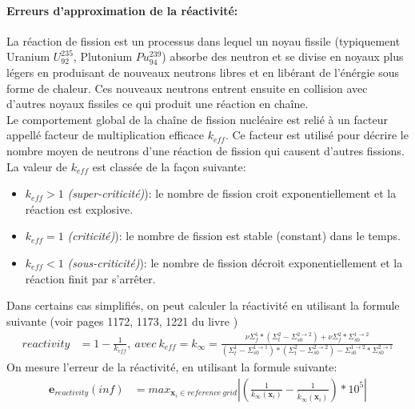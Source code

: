 \paragraph{Erreurs d'approximation de la réactivité:\\}
\hspace{0.5cm} La réaction de fission est un processus dans lequel un noyau fissile (typiquement Uranium $U_{92}^{235}$, Plutonium $Pu_{94}^239$) absorbe
des neutron et se divise en noyaux plus légers en produisant de nouveaux neutrons libres et en libérant de l'énérgie sous forme de chaleur.
Ces nouveaux neutrons entrent ensuite en collision avec d'autres noyaux fissiles ce qui produit une réaction en chaîne.\\
\hspace{0.5cm} Le comportement global de la chaîne de fission nucléaire est relié à un facteur appellé facteur de multiplication efficace $k_{eff}$.
Ce facteur est utilisé pour décrire le nombre moyen de neutrons d'une réaction de fission qui causent d'autres fissions.\\
La valeur de $k_{eff}$ est classée de la façon suivante:
\begin{itemize}
\item $k_{eff} > 1$ \textit{(super-criticité)}): le nombre de fission croit exponentiellement et la
réaction est explosive.
\item $k_{eff} = 1$ \textit{(criticité)}): le nombre de fission est stable (constant) dans le temps.
\item $k_{eff} < 1$ \textit{(sous-criticité)}): le nombre de fission décroit exponentiellement et la
réaction finit par s'arrêter.
\end{itemize}
Dans certains cas simplifiés, on peut calculer la réactivité en utilisant la formule suivante (voir pages 1172, 1173, 1221 du livre \cite{Marguet})
\begin{align}
		reactivity & = 1-\frac{1}{k_{eff}},\ avec\ k_{eff} = k_{\infty}=\frac{\nu\Sigma_f^1 * (\Sigma_t^2-\Sigma_{s0}^{2\rightarrow2}) + \nu\Sigma_f^2*\Sigma_{s0}^{1\rightarrow2}}{(\Sigma_t^1-\Sigma_{s0}^{1\rightarrow1})*(\Sigma_t^2-\Sigma_{s0}^{2\rightarrow2})-\Sigma_{s0}^{1\rightarrow2}*\Sigma_{s0}^{2\rightarrow1}}
\end{align}
On mesure l'erreur de la réactivité, en utilisant la formule suivante:
\begin{align}
		\textbf{e}_{reactivity}{(inf)} & = max_{\textbf{x}_i \in reference\ grid} \left | (\frac{1}{k_{\infty}(\textbf{x}_i)} - \frac{1}{\tilde{k}_{\infty}(\textbf{x}_i)})*10^5 \right |
\end{align}
